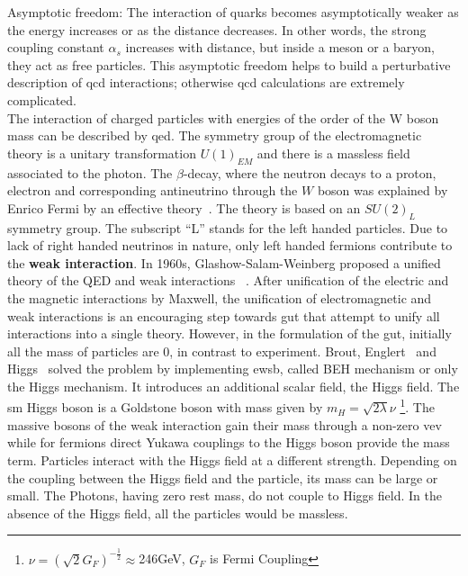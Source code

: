 Asymptotic freedom:
The interaction of quarks becomes asymptotically weaker as the energy increases or as the distance decreases. In other words, the strong coupling constant $\alpha_s$  increases with distance, but inside a meson or a baryon, they act as free particles. This asymptotic freedom helps to build a perturbative description of \acrshort{qcd} interactions; otherwise \acrshort{qcd} calculations are extremely complicated.\\
The interaction of charged particles with energies of the order of the W boson mass can be described  by \acrfull{qed}. The symmetry group of the electromagnetic theory is a unitary transformation $U(1)_{EM}$ and there is a massless field associated to the photon.
The $\beta$-decay, where the neutron decays to a proton, electron and corresponding antineutrino through the $W$ boson was explained by Enrico Fermi by an effective theory~\cite{Fermi}. The theory is based on an $SU(2)_L$ symmetry group. The subscript “L” stands for the left handed particles. Due to lack of right handed neutrinos in nature, only left handed fermions contribute to the \textbf{weak interaction}.
In 1960s, Glashow-Salam-Weinberg proposed a unified theory of the QED and weak interactions ~\cite{glashow,salam,weinberg}.
After unification of the electric and the magnetic interactions by Maxwell, the unification of electromagnetic and weak interactions is an encouraging step towards \acrfull{gut} that attempt to unify all interactions into a single theory.
However, in the formulation of the \acrshort{gut}, initially all the mass of particles are 0, in contrast to experiment.
Brout, Englert~\cite{higgs1} and Higgs~\cite{higgs2} solved the problem by implementing \acrfull{ewsb}, called BEH mechanism or only the Higgs mechanism. It introduces an additional scalar field, the Higgs field. The \acrshort{sm} Higgs boson is a Goldstone boson with mass given by $m_H=\sqrt{2\lambda}\nu$ \footnote{\label{fn:vev}$\nu=(\sqrt{2}G_F)^{-\frac{1}{2}}\approx$246GeV, $G_F$ is Fermi Coupling}. The massive bosons of the weak interaction gain their mass through a non-zero \acrfull{vev} while for fermions direct Yukawa couplings to the Higgs boson provide the mass term.
Particles interact with the Higgs field at a different strength. Depending on the coupling between the Higgs field and the particle, its mass can be large or small. The Photons, having zero rest mass, do not couple to Higgs field. In the absence of the Higgs field, all the particles would be massless. 


